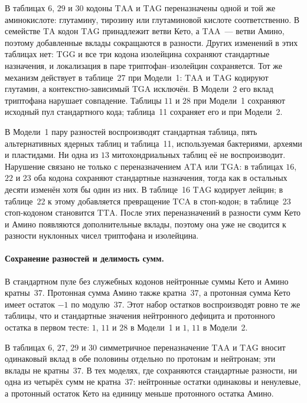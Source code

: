 \documentclass[11pt,a4paper]{article}
\renewcommand{\_}{\origunderscore\allowbreak}
\begin{document}
В таблицах $6$, $29$ и $30$ кодоны $\mathrm{TAA}$
и $\mathrm{TAG}$ переназначены одной и той же
аминокислоте: глутамину, тирозину или глутаминовой
кислоте соответственно. В семействе $\mathrm{TA}$
кодон $\mathrm{TAG}$ принадлежит ветви Кето,
а $\mathrm{TAA}$~--- ветви Амино, поэтому добавленные
вклады сокращаются в разности. Других изменений
в этих таблицах нет: $\mathrm{TGG}$ и все три кодона
изолейцина сохраняют стандартные назначения, и
локализация в паре триптофан--изолейцин сохраняется.
Тот же механизм действует в таблице~27 при Модели~1:
$\mathrm{TAA}$ и $\mathrm{TAG}$ кодируют глутамин,
а контекстно-зависимый $\mathrm{TGA}$ исключён.
В Модели~2 его вклад триптофана нарушает совпадение.
Таблицы $11$ и $28$ при Модели~1 сохраняют исходный
пул стандартного кода; таблица~11 сохраняет его и
при Модели~2.

В Модели~1 пару разностей воспроизводят стандартная
таблица, пять альтернативных ядерных таблиц
и таблица~11, используемая бактериями, археями
и пластидами. Ни одна из $13$ митохондриальных
таблиц её не воспроизводит. Нарушение связано
не только с переназначением $\mathrm{ATA}$ или
$\mathrm{TGA}$: в таблицах $16$, $22$ и $23$ оба
кодона сохраняют стандартные назначения, тогда как
в остальных десяти изменён хотя бы один из них.
В таблице~16 $\mathrm{TAG}$ кодирует лейцин;
в таблице~22 к этому добавляется превращение
$\mathrm{TCA}$ в стоп-кодон; в таблице~23 стоп-кодоном
становится $\mathrm{TTA}$. После этих переназначений в разности сумм Кето
и Амино появляются дополнительные вклады, поэтому
она уже не сводится к разности нуклонных чисел
триптофана и изолейцина.

\paragraph{Сохранение разностей и делимость сумм.}
В стандартном пуле без служебных кодонов нейтронные
суммы Кето и Амино кратны~$37$. Протонная сумма
Амино также кратна~$37$, а протонная сумма Кето
имеет остаток $-1$ по модулю~$37$.
Этот набор остатков воспроизводят ровно те же
таблицы, что и стандартные значения нейтронного
дефицита и протонного остатка в первом тесте:
$1$, $11$ и $28$ в Модели~1 и $1$, $11$
в Модели~2.

В таблицах $6$, $27$, $29$ и $30$ симметричное
переназначение $\mathrm{TAA}$ и $\mathrm{TAG}$
вносит одинаковый вклад в обе половины отдельно
по протонам и нейтронам; эти вклады не кратны~$37$.
В тех моделях, где сохраняются стандартные
разности, ни одна из четырёх сумм не кратна~$37$:
нейтронные остатки одинаковы и ненулевые,
а протонный остаток Кето на единицу меньше
протонного остатка Амино.
\end{document}
